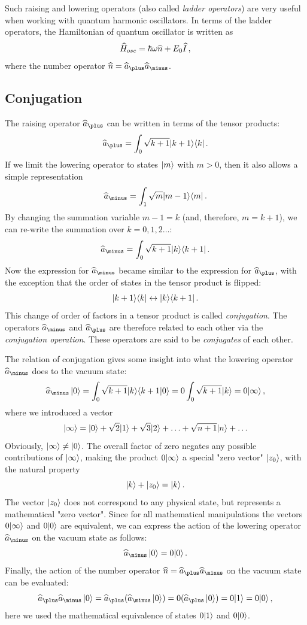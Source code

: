 Such raising and lowering operators (also called \emph{ladder operators}) are very useful when working with quantum harmonic oscillators. In terms of the ladder operators, the Hamiltonian of quantum oscillator is written as
\[
\widehat{H}_{osc} = \hbar\omega\widehat{n}+E_0\widehat{I}\,,
\]
where the number operator $\op{n}=\op{a}_\plus\op{a}_\minus$. 


\subsection{Conjugation}
The raising operator $\op{a}_\plus$ can be written in terms of the tensor products:
\[
\op{a}_\plus=\int_0 \sqrt{k+1}\ketbra{k+1}{k}\,.
\]
If we limit the lowering operator to states $|{m}\rangle$ with $m>0$, then it also allows a simple representation
\[
\op{a}_\minus=\int_1 \sqrt{m}\ketbra{m-1}{m}\,.
\]
By changing the summation variable $m-1=k$ (and, therefore, $m=k+1$), we can re-write the summation over $k=0,1,2\ldots$:
\[
\op{a}_\minus=\int_0 \sqrt{k+1}\ketbra{k}{k+1}\,.
\]
Now the expression for $\op{a}_\minus$ became similar to the expression for $\op{a}_\plus$, with the exception that the order of states in the tensor product is flipped:
\[
|{k+1}\rangle\langle{k}|\leftrightarrow |{k}\rangle\langle{k+1}|\,.
\]
This change of order of factors in a tensor product is called \emph{conjugation}. The operators $\op{a}_\minus$ and $\op{a}_\plus$ are therefore related to each other via the \emph{conjugation operation}. These operators are said to be \emph{conjugates} of each other. 

The relation of conjugation gives some insight into what the lowering operator $\op{a}_\minus$ does to the vacuum state:
\[
\op{a}_\minus\,\ket{0}=\int_0  \sqrt{k+1}\ket{k}\braket{k+1}{0}=0\int_0\sqrt{k+1}\ket{k}=0\ket{\infty}\,,
\]
where we introduced a vector 
\[
|{\infty}\rangle=|{0}\rangle+\sqrt{2}|{1}\rangle+\sqrt{3}|{2}\rangle+\ldots+\sqrt{n+1}|{n}\rangle+\ldots
\]
Obviously, $|{\infty}\rangle\ne|{0}\rangle$. The overall factor of zero negates any possible contributions of $|{\infty}\rangle$, making the product $0|{\infty}\rangle$ a special "zero vector" $|{z_0}\rangle$, with the natural property
\[
|{k}\rangle+|{z_0}\rangle=|{k}\rangle\,.
\]
The vector $|{z_0}\rangle$ does not correspond to any physical state, but represents a mathematical "zero vector". Since for all mathematical manipulations the vectors $0|{\infty}\rangle$ and $0|{0}\rangle$ are equivalent,
we can express the action of the lowering operator $\op{a}_\minus$ on the vacuum state as follows:
\[
\op{a}_\minus\,\ket{0}=0\ket{0}\,.
\]
Finally, the action of the number operator $\op{n}=\op{a}_\plus\op{a}_\minus$ on the vacuum state can be evaluated:
\[
\op{a}_\plus\op{a}_\minus\,\ket{0}=\op{a}_\plus(\op{a}_\minus\,\ket{0})=0(\op{a}_\plus\,\ket{0})=0\ket{1}=0\ket{0}\,,
\]
here we used the mathematical equivalence of states $0|{1}\rangle$ and $0|{0}\rangle$.

